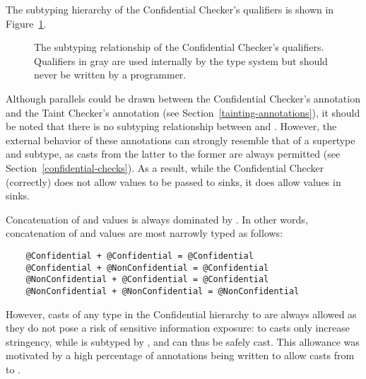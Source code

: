 The subtyping hierarchy of the Confidential Checker's qualifiers is shown in
Figure~\ref{fig-confidential-hierarchy}.

\begin{figure}
\caption{The subtyping relationship of the Confidential Checker's qualifiers.
  Qualifiers in gray are used internally by the type system but should never
  be written by a programmer.}
\label{fig-confidential-hierarchy}
\end{figure}

Although parallels could be drawn between the Confidential Checker's
 annotation and the Taint Checker's 
annotation (see Section~\ref{tainting-annotations}), it should be noted that
there is no subtyping relationship between  and
. However, the external behavior of these annotations
can strongly resemble that of a supertype and subtype, as casts from the latter
to the former are always permitted (see Section~\ref{confidential-checks}). As
a result, while the Confidential Checker (correctly) does not allow
 values to be passed to  sinks, it does
allow  values in  sinks.


Concatenation of  and  values is
always dominated by . In other words, concatenation of
 and  values are most narrowly typed
as follows:

\begin{Verbatim}
    @Confidential + @Confidential = @Confidential
    @Confidential + @NonConfidential = @Confidential
    @NonConfidential + @Confidential = @Confidential
    @NonConfidential + @NonConfidential = @NonConfidential
\end{Verbatim}

However, casts of any type in the Confidential hierarchy to 
are always allowed as they do not pose a risk of sensitive information exposure:
 to  casts only increase stringency,
while  is subtyped by ,
 and can thus be safely cast. This allowance was motivated
by a high percentage of  annotations being written to allow
casts from  to .

